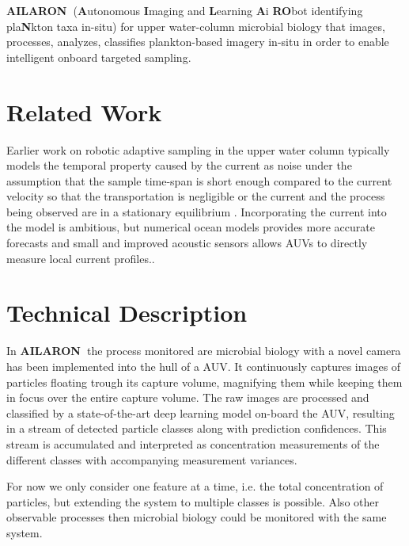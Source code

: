 \documentclass[conference]{IEEEtran}
\def\proj{{\textbf{AILARON\ }}}
\newcommand{\cmt}[1]{{\color{red}{#1}}}
\begin{document}
\proj (\textbf{A}utonomous \textbf{I}maging and \textbf{L}earning
\textbf{A}i \textbf{RO}bot identifying pla\textbf{N}kton taxa in-situ)
for upper water-column microbial biology that images, processes,
analyzes, classifies plankton-based imagery in-situ in order to enable
intelligent onboard targeted sampling.


\section{Related Work}

Earlier work on robotic adaptive sampling in the upper water column
typically models the temporal property caused by the current as noise
under the assumption that the sample time-span is short enough
compared to the current velocity so that the transportation is
negligible or the current and the process being observed are in a
stationary equilibrium \cite{fossum18b}.  Incorporating the current into the model is
ambitious, but numerical ocean models provides more accurate forecasts
and small and improved acoustic sensors allows AUVs to directly
measure local current profiles.\cmt{give citations with a bibliography}.



\section{Technical Description}

In \proj the process monitored are microbial biology with a novel
camera has been implemented into the hull of a AUV.  It continuously
captures images of particles floating trough its capture volume,
magnifying them while keeping them in focus over the entire capture
volume.  The raw images are processed and classified by a
state-of-the-art deep learning model on-board the AUV, resulting in a
stream of detected particle classes along with prediction confidences.
This stream is accumulated and interpreted as concentration
measurements of the different classes with accompanying measurement
variances.

For now we only consider one feature at a time, i.e. the total
concentration of particles, but extending the system to multiple
classes is possible.  Also other observable processes then microbial
biology could be monitored with the same system.
\end{document}
